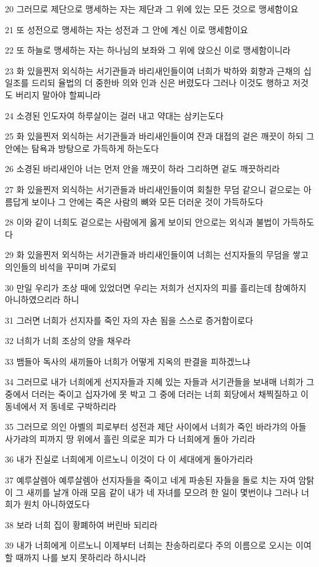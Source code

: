 \par 20 그러므로 제단으로 맹세하는 자는 제단과 그 위에 있는 모든 것으로 맹세함이요
\par 21 또 성전으로 맹세하는 자는 성전과 그 안에 계신 이로 맹세함이요
\par 22 또 하늘로 맹세하는 자는 하나님의 보좌와 그 위에 앉으신 이로 맹세함이니라
\par 23 화 있을찐저 외식하는 서기관들과 바리새인들이여 너희가 박하와 회향과 근채의 십일조를 드리되 율법의 더 중한바 의와 인과 신은 버렸도다 그러나 이것도 행하고 저것도 버리지 말아야 할찌니라
\par 24 소경된 인도자여 하루살이는 걸러 내고 약대는 삼키는도다
\par 25 화 있을찐저 외식하는 서기관들과 바리새인들이여 잔과 대접의 겉은 깨끗이 하되 그 안에는 탐욕과 방탕으로 가득하게 하는도다
\par 26 소경된 바리새인아 너는 먼저 안을 깨끗이 하라 그리하면 겉도 깨끗하리라
\par 27 화 있을찐저 외식하는 서기관들과 바리새인들이여 회칠한 무덤 같으니 겉으로는 아름답게 보이나 그 안에는 죽은 사람의 뼈와 모든 더러운 것이 가득하도다
\par 28 이와 같이 너희도 겉으로는 사람에게 옳게 보이되 안으로는 외식과 불법이 가득하도다
\par 29 화 있을찐저 외식하는 서기관들과 바리새인들이여 너희는 선지자들의 무덤을 쌓고 의인들의 비석을 꾸미며 가로되
\par 30 만일 우리가 조상 때에 있었더면 우리는 저희가 선지자의 피를 흘리는데 참예하지 아니하였으리라 하니
\par 31 그러면 너희가 선지자를 죽인 자의 자손 됨을 스스로 증거함이로다
\par 32 너희가 너희 조상의 양을 채우라
\par 33 뱀들아 독사의 새끼들아 너희가 어떻게 지옥의 판결을 피하겠느냐
\par 34 그러므로 내가 너희에게 선지자들과 지혜 있는 자들과 서기관들을 보내매 너희가 그 중에서 더러는 죽이고 십자가에 못 박고 그 중에 더러는 너희 회당에서 채찍질하고 이 동네에서 저 동네로 구박하리라
\par 35 그러므로 의인 아벨의 피로부터 성전과 제단 사이에서 너희가 죽인 바라갸의 아들 사가랴의 피까지 땅 위에서 흘린 의로운 피가 다 너희에게 돌아 가리라
\par 36 내가 진실로 너희에게 이르노니 이것이 다 이 세대에게 돌아가리라
\par 37 예루살렘아 예루살렘아 선지자들을 죽이고 네게 파송된 자들을 돌로 치는 자여 암탉이 그 새끼를 날개 아래 모음 같이 내가 네 자녀를 모으려 한 일이 몇번이냐 그러나 너희가 원치 아니하였도다
\par 38 보라 너희 집이 황폐하여 버린바 되리라
\par 39 내가 너희에게 이르노니 이제부터 너희는 찬송하리로다 주의 이름으로 오시는 이여 할 때까지 나를 보지 못하리라 하시니라

